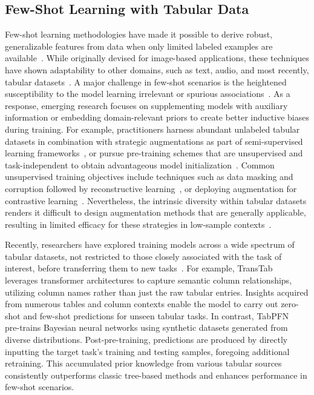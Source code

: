 \subsection{Few-Shot Learning with Tabular Data}
Few-shot learning methodologies have made it possible to derive robust, generalizable features from data when only limited labeled examples are available~\cite{chen2018closer}. While originally devised for image-based applications, these techniques have shown adaptability to other domains, such as text, audio, and most recently, tabular datasets~\cite{majumder2022few,nam2023stunt,schick2021exploiting}. A major challenge in few-shot scenarios is the heightened susceptibility to the model learning irrelevant or spurious associations~\cite{bartlett2021deep}. As a response, emerging research focuses on supplementing models with auxiliary information or embedding domain-relevant priors to create better inductive biases during training. For example, practitioners harness abundant unlabeled tabular datasets in combination with strategic augmentations as part of semi-supervised learning frameworks~\cite{ucar2021subtab,yoon2020vime}, or pursue pre-training schemes that are unsupervised and task-independent to obtain advantageous model initialization~\cite{somepalli2021saint}. Common unsupervised training objectives include techniques such as data masking and corruption followed by reconstructive learning~\cite{arik2021tabnet,majmundar2022met}, or deploying augmentation for contrastive learning~\cite{bahri2022scarf,chen2020simple}. Nevertheless, the intrinsic diversity within tabular datasets renders it difficult to design augmentation methods that are generally applicable, resulting in limited efficacy for these strategies in low-sample contexts~\cite{nam2023stunt}.

Recently, researchers have explored training models across a wide spectrum of tabular datasets, not restricted to those closely associated with the task of interest, before transferring them to new tasks~\cite{zhang2023generative,levin2022transfer,zhu2023xtab}. For example, TransTab~\cite{wang2022transtab} leverages transformer architectures to capture semantic column relationships, utilizing column names rather than just the raw tabular entries. Insights acquired from numerous tables and column contexts enable the model to carry out zero-shot and few-shot predictions for unseen tabular tasks. In contrast, TabPFN~\cite{hollmann2022tabpfn} pre-trains Bayesian neural networks using synthetic datasets generated from diverse distributions. Post-pre-training, predictions are produced by directly inputting the target task's training and testing samples, foregoing additional retraining. This accumulated prior knowledge from various tabular sources consistently outperforms classic tree-based methods and enhances performance in few-shot scenarios.

